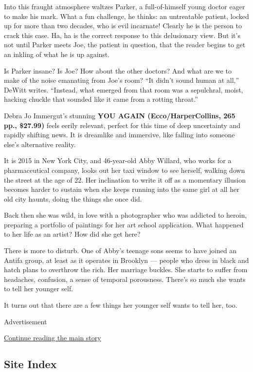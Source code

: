 Into this fraught atmosphere waltzes Parker, a full-of-himself young
doctor eager to make his mark. What a fun challenge, he thinks: an
untreatable patient, locked up for more than two decades, who is evil
incarnate! Clearly he is the person to crack this case. Ha, ha is the
correct response to this delusionary view. But it's not until Parker
meets Joe, the patient in question, that the reader begins to get an
inkling of what he is up against.

Is Parker insane? Is Joe? How about the other doctors? And what are we
to make of the noise emanating from Joe's room? ``It didn't sound human
at all,'' DeWitt writes. ``Instead, what emerged from that room was a
sepulchral, moist, hacking chuckle that sounded like it came from a
rotting throat.''

Debra Jo Immergut's stunning \textbf{YOU AGAIN (Ecco/HarperCollins, 265
pp., \$27.99)} feels eerily relevant, perfect for this time of deep
uncertainty and rapidly shifting news. It is dreamlike and immersive,
like falling into someone else's alternative reality.

It is 2015 in New York City, and 46-year-old Abby Willard, who works for
a pharmaceutical company, looks out her taxi window to see herself,
walking down the street at the age of 22. Her inclination to write it
off as a momentary illusion becomes harder to sustain when she keeps
running into the same girl at all her old city haunts, doing the things
she once did.

Back then she was wild, in love with a photographer who was addicted to
heroin, preparing a portfolio of paintings for her art school
application. What happened to her life as an artist? How did she get
here?

There is more to disturb. One of Abby's teenage sons seems to have
joined an Antifa group, at least as it operates in Brooklyn --- people
who dress in black and hatch plans to overthrow the rich. Her marriage
buckles. She starts to suffer from headaches, confusion, a sense of
temporal porousness. There's so much she wants to tell her younger self.

It turns out that there are a few things her younger self wants to tell
her, too.

Advertisement

\protect\hyperlink{after-bottom}{Continue reading the main story}

\hypertarget{site-index}{%
\subsection{Site Index}\label{site-index}}


